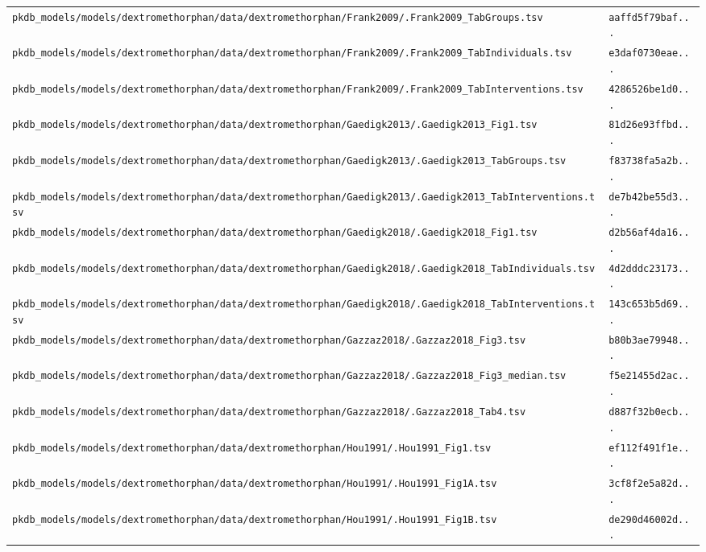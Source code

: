 \begin{longtable}{ll}
\texttt{pkdb\_models/models/dextromethorphan/data/dextromethorphan/Frank2009/.Frank2009\_TabGroups.tsv} & \texttt{aaffd5f79baf...} \\
\texttt{pkdb\_models/models/dextromethorphan/data/dextromethorphan/Frank2009/.Frank2009\_TabIndividuals.tsv} & \texttt{e3daf0730eae...} \\
\texttt{pkdb\_models/models/dextromethorphan/data/dextromethorphan/Frank2009/.Frank2009\_TabInterventions.tsv} & \texttt{4286526be1d0...} \\
\texttt{pkdb\_models/models/dextromethorphan/data/dextromethorphan/Gaedigk2013/.Gaedigk2013\_Fig1.tsv} & \texttt{81d26e93ffbd...} \\
\texttt{pkdb\_models/models/dextromethorphan/data/dextromethorphan/Gaedigk2013/.Gaedigk2013\_TabGroups.tsv} & \texttt{f83738fa5a2b...} \\
\texttt{pkdb\_models/models/dextromethorphan/data/dextromethorphan/Gaedigk2013/.Gaedigk2013\_TabInterventions.tsv} & \texttt{de7b42be55d3...} \\
\texttt{pkdb\_models/models/dextromethorphan/data/dextromethorphan/Gaedigk2018/.Gaedigk2018\_Fig1.tsv} & \texttt{d2b56af4da16...} \\
\texttt{pkdb\_models/models/dextromethorphan/data/dextromethorphan/Gaedigk2018/.Gaedigk2018\_TabIndividuals.tsv} & \texttt{4d2dddc23173...} \\
\texttt{pkdb\_models/models/dextromethorphan/data/dextromethorphan/Gaedigk2018/.Gaedigk2018\_TabInterventions.tsv} & \texttt{143c653b5d69...} \\
\texttt{pkdb\_models/models/dextromethorphan/data/dextromethorphan/Gazzaz2018/.Gazzaz2018\_Fig3.tsv} & \texttt{b80b3ae79948...} \\
\texttt{pkdb\_models/models/dextromethorphan/data/dextromethorphan/Gazzaz2018/.Gazzaz2018\_Fig3\_median.tsv} & \texttt{f5e21455d2ac...} \\
\texttt{pkdb\_models/models/dextromethorphan/data/dextromethorphan/Gazzaz2018/.Gazzaz2018\_Tab4.tsv} & \texttt{d887f32b0ecb...} \\
\texttt{pkdb\_models/models/dextromethorphan/data/dextromethorphan/Hou1991/.Hou1991\_Fig1.tsv} & \texttt{ef112f491f1e...} \\
\texttt{pkdb\_models/models/dextromethorphan/data/dextromethorphan/Hou1991/.Hou1991\_Fig1A.tsv} & \texttt{3cf8f2e5a82d...} \\
\texttt{pkdb\_models/models/dextromethorphan/data/dextromethorphan/Hou1991/.Hou1991\_Fig1B.tsv} & \texttt{de290d46002d...} \\

\end{longtable}
